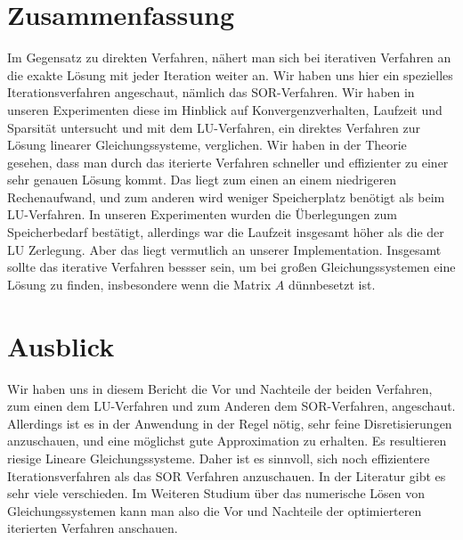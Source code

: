 \documentclass[smallheadings]{scrartcl}
\theoremstyle{definition}
\begin{document}
\section{Zusammenfassung}

Im Gegensatz zu direkten Verfahren, nähert man sich bei iterativen Verfahren an die exakte Lösung mit jeder Iteration weiter an.  Wir haben uns hier ein spezielles Iterationsverfahren angeschaut, nämlich das SOR-Verfahren. Wir haben in unseren Experimenten diese im Hinblick auf Konvergenzverhalten, Laufzeit und Sparsität untersucht und mit dem LU-Verfahren, ein direktes Verfahren zur Lösung linearer Gleichungssysteme, verglichen.  Wir haben in der Theorie gesehen, dass man durch das iterierte Verfahren schneller und effizienter zu einer sehr genauen Lösung kommt.  Das liegt zum einen an einem niedrigeren Rechenaufwand, und zum anderen wird weniger Speicherplatz benötigt als beim LU-Verfahren.  In unseren Experimenten wurden die Überlegungen zum Speicherbedarf bestätigt, allerdings war die Laufzeit insgesamt höher als die der LU Zerlegung.  Aber das liegt vermutlich an unserer Implementation. Insgesamt sollte das iterative Verfahren bessser sein, um bei großen Gleichungssystemen eine Lösung zu finden, insbesondere wenn die Matrix $A$ dünnbesetzt ist. 



\section{Ausblick}
Wir haben uns in diesem Bericht die Vor und Nachteile der beiden Verfahren, zum einen dem LU-Verfahren und zum Anderen dem SOR-Verfahren, angeschaut.  Allerdings ist es in der Anwendung in der Regel nötig,  sehr feine Disretisierungen anzuschauen, und eine möglichst gute Approximation zu erhalten.  Es resultieren riesige Lineare Gleichungssysteme. Daher ist es sinnvoll, sich noch effizientere Iterationsverfahren als das SOR Verfahren anzuschauen. In der Literatur gibt es sehr viele verschieden. Im Weiteren Studium über das numerische Lösen von Gleichungssystemen kann man also die Vor und Nachteile der optimierteren iterierten Verfahren anschauen. 



\printbibliography

\end{document}
